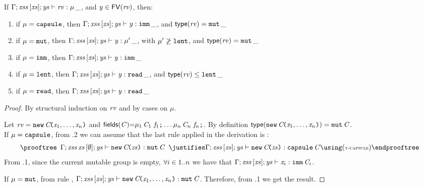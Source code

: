 {\begin{theorem}
If $\Gamma;\mathit{xss}\,[\mathit{xs}];\mathit{ys}\vdash \mathit{rv}:\mu\,\_$, and $\mathit{y}\in\textsf{FV}(\mathit{rv})$, then:
 \begin{enumerate}
 \item if $\mu=\texttt{capsule}$, then $\Gamma;\mathit{xss}\,[\mathit{xs}];\mathit{ys}\vdash \mathit{y}:\texttt{imm}\,\_$, and $\textsf{type}(\mathit{rv})=\texttt{mut}\,\_$ 
  \item if $\mu=\texttt{mut}$, then $\Gamma;\mathit{xss}\,[\mathit{xs}];\mathit{ys}\vdash \mathit{y}:\mu'\,\_$, with $\mu'\not\geq\texttt{lent}$, and $\textsf{type}(\mathit{rv})=\texttt{mut}\,\_$
  \item if $\mu=\texttt{imm}$, then $\Gamma;\mathit{xss}\,[\mathit{xs}];\mathit{ys}\vdash \mathit{y}:\texttt{imm}\,\_$
   \item if $\mu=\texttt{lent}$, then $\Gamma;\mathit{xss}\,[\mathit{xs}];\mathit{ys}\vdash \mathit{y}:\texttt{read}\,\_$, and $\textsf{type}(\mathit{rv})\leq\texttt{lent}\,\_$ 
   \item if $\mu=\texttt{read}$, then $\Gamma;\mathit{xss}\,[\mathit{xs}];\mathit{ys}\vdash \mathit{y}:\texttt{read}\,\_$
 \end{enumerate}
\end{theorem}
\begin{proof} 
By structural induction on $\mathit{rv}$ and by cases on $\mu$. 

\medskip\noindent
Let \underline{$\mathit{rv}=\texttt{new}\,\mathit{C}\!\texttt{(}\mathit{x}_1,\ldots,\mathit{x}_n\texttt{)}$} and $\textsf{fields}(\mathit{C}){=}\mu_1\,\mathit{C}_1\ \mathit{f}_1\texttt{;}\ldots\mu_n\,\mathit{C}_n\ \mathit{f}_n\texttt{;}$.  By definition
$\textsf{type}(\texttt{new}\,\mathit{C}\!\texttt{(}\mathit{x}_1,\ldots,\mathit{x}_n\texttt{)})=\texttt{mut}\,\mathit{C}$.\\

\medskip\noindent
If \underline{$\mu=\texttt{capsule}$},  from .2 we can assume that the last rule applied in the derivation is
:
\[
\prooftree
\begin{array}{c}
\AuxTypeCheck{\Gamma}{\LentLocked\,\xs}{\emptyset}{\StronglyLocked}{{\ConstrCall{\C}{\zs}}}{\Type{\mutable}{\C}}
\end{array}
\justifies
\AuxTypeCheck{\Gamma}{\LentLocked}{\MutGroup}{\StronglyLocked}{{{\ConstrCall{\C}{\zs}}}}{\Type{\capsule}{\C}}
\using
\rn{t-capsule}
\endprooftree
\]
From .1, since the current mutable group is empty, 
$\forall i\in1..n$ we have that
$\Gamma;\mathit{xss}\,[\mathit{xs}];\mathit{ys}\vdash \mathit{x}_i:\texttt{imm}\,\mathit{C}_i$.

\medskip\noindent
If \underline{$\mu=\texttt{mut}$}, from rule , 
$\Gamma;\mathit{xss}\,[\mathit{xs}];\mathit{ys}\vdash \texttt{new}\,\mathit{C}\!\texttt{(}\mathit{x}_1,\ldots,\mathit{x}_n\texttt{)}:\texttt{mut}\,\mathit{C}$.
Therefore, from .1 we get the result. 


\end{proof}}

